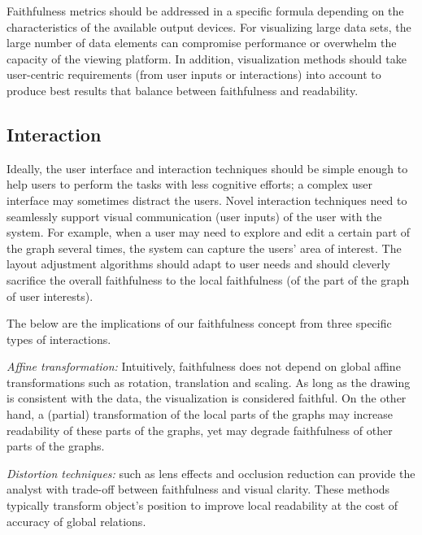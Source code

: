 \documentclass[10pt,journal,cspaper,compsoc]{IEEEtran}
\begin{document}
Faithfulness metrics should be addressed in a specific formula depending on the characteristics of the available output devices.
For visualizing large data sets, the large number of data elements can compromise performance or overwhelm the capacity of the viewing platform.
In addition, visualization methods should take user-centric requirements (from user inputs or interactions) into account to produce best results that balance between faithfulness and readability.

\subsection{Interaction}
Ideally, the user interface and interaction techniques should be simple enough to help users to perform the tasks with less cognitive efforts; a complex user interface may sometimes distract the users.
Novel interaction techniques need to seamlessly support visual communication (user inputs) of the user with the system.
For example, when a user may need to explore and edit a certain part of the graph several times, the system can capture the users' area of interest. The layout adjustment algorithms should adapt to user needs and should cleverly sacrifice the overall faithfulness to the local faithfulness (of the part of the graph of user interests).



The below are the implications of our faithfulness concept from three specific types of interactions.

{\it Affine transformation:} Intuitively, faithfulness does not depend on global affine transformations such as rotation, translation and scaling. As long as the drawing is consistent with the data, the visualization is considered faithful. 
On the other hand, a (partial) transformation of the local parts of the graphs may increase readability of these parts of the graphs, yet may degrade faithfulness of other parts of the graphs.

{\it Distortion techniques:} such as lens effects and occlusion reduction can provide the analyst with trade-off between faithfulness and visual clarity. These methods typically transform object's position to improve local readability at the cost of accuracy of global relations.
\end{document}
